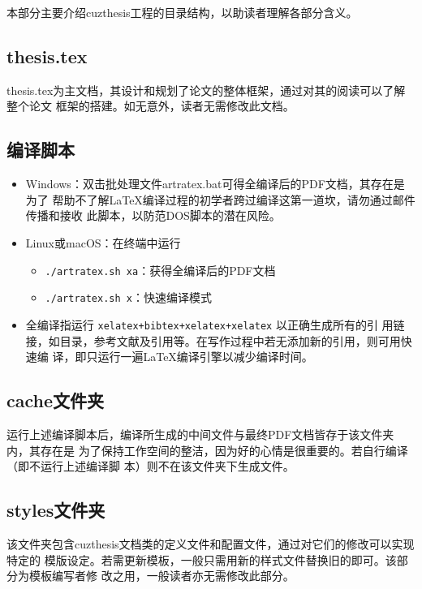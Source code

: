 本部分主要介绍cuzthesis工程的目录结构，以助读者理解各部分含义。

\subsection{thesis.tex}

thesis.tex为主文档，其设计和规划了论文的整体框架，通过对其的阅读可以了解整个论文
框架的搭建。如无意外，读者无需修改此文档。

\subsection{编译脚本}

\begin{itemize}
    \item Windows：双击批处理文件artratex.bat可得全编译后的PDF文档，其存在是为了
    帮助不了解\LaTeX{}编译过程的初学者跨过编译这第一道坎，请勿通过邮件传播和接收
    此脚本，以防范DOS脚本的潜在风险。
    \item Linux或macOS：在终端中运行
        \begin{itemize}
            \item \verb|./artratex.sh xa|：获得全编译后的PDF文档
            \item \verb|./artratex.sh x|：快速编译模式
        \end{itemize}
    \item 全编译指运行 \verb|xelatex+bibtex+xelatex+xelatex| 以正确生成所有的引
    用链接，如目录，参考文献及引用等。在写作过程中若无添加新的引用，则可用快速编
    译，即只运行一遍\LaTeX{}编译引擎以减少编译时间。
\end{itemize}

\subsection{cache文件夹}

运行上述编译脚本后，编译所生成的中间文件与最终PDF文档皆存于该文件夹内，其存在是
为了保持工作空间的整洁，因为好的心情是很重要的。若自行编译（即不运行上述编译脚
本）则不在该文件夹下生成文件。

\subsection{styles文件夹}

该文件夹包含cuzthesis文档类的定义文件和配置文件，通过对它们的修改可以实现特定的
模版设定。若需更新模板，一般只需用新的样式文件替换旧的即可。该部分为模板编写者修
改之用，一般读者亦无需修改此部分。

